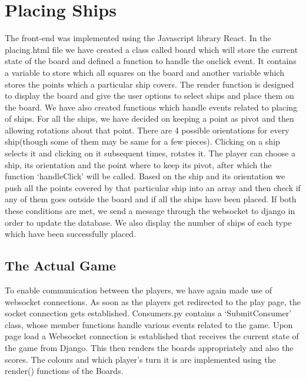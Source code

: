 \documentclass[titlepage]{article}
\begin{document}
\section{Placing Ships}
The front-end was implemented using the Javascript library React.
In the placing.html file we have created a class called board which will store the current state of the board and defined a function to handle the onclick event. It contains a variable to store which all squares on the board and another variable which stores the points which a particular ship covers. The render function is designed to display the board and give the user options to select ships and place them on the board. We have also created functions which handle events related to placing of ships. For all the ships, we have decided on keeping a point as pivot and then allowing rotations about that point. There are 4 possible orientations for every ship(though some of them may be same for a few pieces). Clicking on a ship selects it and clicking on it subsequent times, rotates it. The player can choose a ship, its orientation and the point where to keep its pivot, after which the function `handleClick' will be called. Based on the ship and its orientation we push all the points covered by that particular ship into an array and then check if any of them goes outside the board and if all the ships have been placed. If both these conditions are met, we send a message through the websocket to django in order to update the database. We also display the number of ships of each type which have been successfully placed.

\subsection{The Actual Game}
To enable communication between the players, we have again made use of websocket connections. As soon as the players get redirected to the play page, the socket connection gets established. Consumers.py contains a `SubmitConsumer' class, whose member functions handle various events related to the game. Upon page load a Websocket connection is established that receives the current state of the game from Django. This then renders the boards appropriately and also the scores. The colours and which player's turn it is are implemented using the render() functions of the Boards.
\end{document}

